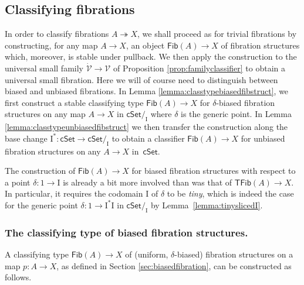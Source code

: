 \documentclass[11pt,reqno]{amsart}
\newcommand{\cSet}{\ensuremath{\mathsf{cSet}}}
\newcommand{\ra}{\ensuremath{\rightarrow}}
\newcommand{\fib}{\ensuremath{\twoheadrightarrow}}
\renewcommand{\to}{\ensuremath{\rightarrow}}
\newcommand{\I}{\ensuremath{\mathrm{I}}}
\newcommand{\V}{\ensuremath{\mathcal{V}}}
\newcommand{\VV}{\ensuremath{\dot{\mathcal{V}}}}
\newcommand{\Fib}{\ensuremath{\mathsf{Fib}}}
\newcommand{\TFib}{\ensuremath{\mathsf{TFib}}}
\theoremstyle{remark}
\theoremstyle{definition}
\begin{document}
\subsection*{Classifying fibrations}\label{sec:universalfibration}

In order to classify fibrations $A\fib X$, we shall proceed as for trivial fibrations by constructing, for any map $A\ra X$, an object $\Fib(A)\to X$ of fibration structures which, moreover, is stable under pullback.  We then apply the construction to the universal small family $\VV\ra\V$ of Proposition \ref{prop:familyclassifier} to obtain a universal small fibration.    Here we will of course need to distinguish between biased and unbiased fibrations.  In Lemma \ref{lemma:classtypebiasedfibstruct}, we first construct a stable classifying type $\Fib(A)\ra X$ for $\delta$-biased fibration structures on any map $A\to X$ in $\cSet/_\I$ where $\delta$ is the generic point.    In Lemma \ref{lemma:classtypeunbiasedfibstruct}
we then transfer the construction along the base change $\I^* : \cSet \to \cSet/_\I$ to obtain a classifier $\Fib(A)\ra X$ for unbiased fibration structures on any $A\to X$ in~$\cSet$.

The construction of $\Fib(A)\ra X$ for biased fibration structures with respect to a point $\delta : 1\to \I$ is already a bit more involved than was that of $\TFib(A)\ra X$.  In particular, it requires the codomain $\I$ of $\delta$ to be \emph{tiny}, which is indeed the case for the generic point $\delta : 1 \to  \I^*\I$ in $\cSet/_\I$ by Lemma~\ref{lemma:tinyslicedI}.

\subsubsection*{The classifying type of biased fibration structures.}

A classifying type $\Fib(A)\ra X$ of (uniform, $\delta$-biased) fibration structures on a map $p: A\ra X$, 
as defined in Section \ref{sec:biasedfibration}, can be constructed as follows.
\end{document}
